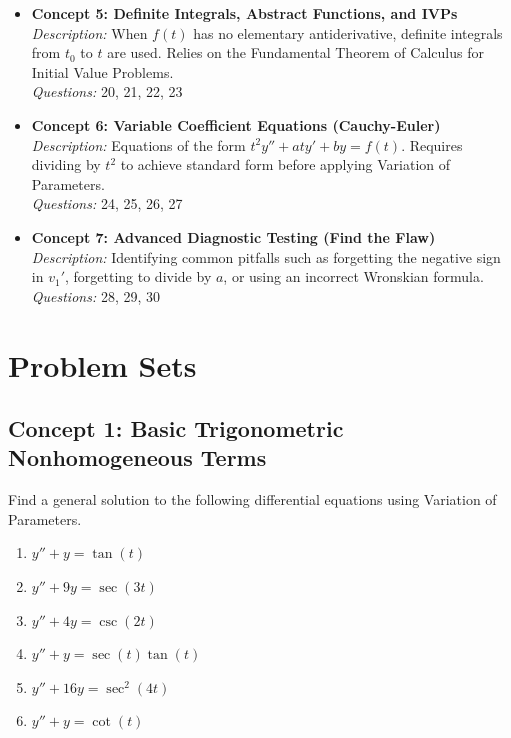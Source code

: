 \documentclass[11pt]{article}
\begin{document}
\begin{itemize}
    \item \textbf{Concept 5: Definite Integrals, Abstract Functions, and IVPs} \\
    \textit{Description:} When $f(t)$ has no elementary antiderivative, definite integrals from $t_0$ to $t$ are used. Relies on the Fundamental Theorem of Calculus for Initial Value Problems. \\
    \textit{Questions:} 20, 21, 22, 23
    
    \item \textbf{Concept 6: Variable Coefficient Equations (Cauchy-Euler)} \\
    \textit{Description:} Equations of the form $t^2y'' + aty' + by = f(t)$. Requires dividing by $t^2$ to achieve standard form before applying Variation of Parameters. \\
    \textit{Questions:} 24, 25, 26, 27
    
    \item \textbf{Concept 7: Advanced Diagnostic Testing (Find the Flaw)} \\
    \textit{Description:} Identifying common pitfalls such as forgetting the negative sign in $v_1'$, forgetting to divide by $a$, or using an incorrect Wronskian formula. \\
    \textit{Questions:} 28, 29, 30
\end{itemize}

\newpage

\section{Problem Sets}

\subsection*{Concept 1: Basic Trigonometric Nonhomogeneous Terms}
Find a general solution to the following differential equations using Variation of Parameters.
\begin{enumerate}
    \item $y'' + y = \tan(t)$
    \item $y'' + 9y = \sec(3t)$
    \item $y'' + 4y = \csc(2t)$
    \item $y'' + y = \sec(t)\tan(t)$
    \item $y'' + 16y = \sec^2(4t)$
    \item $y'' + y = \cot(t)$
\end{enumerate}
\end{document}
